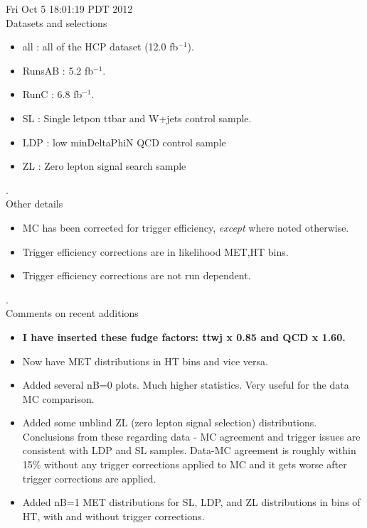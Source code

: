 \documentclass[11pt]{article}
\begin{document}
   Fri Oct  5 18:01:19 PDT 2012 \\

   Datasets and selections
   \begin{itemize}
     \item all : all of the HCP dataset (12.0 fb$^{-1}$).
     \item RunsAB : 5.2 fb$^{-1}$.
     \item RunC : 6.8 fb$^{-1}$.
     \item SL : Single letpon ttbar and W+jets control sample.
     \item LDP : low minDeltaPhiN QCD control sample
     \item ZL : Zero lepton signal search sample
   \end{itemize}

.\\

   Other details
   \begin{itemize}
     \item MC has been corrected for trigger efficiency, {\it except} where noted otherwise.
     \item Trigger efficiency corrections are in likelihood MET,HT bins.
     \item Trigger efficiency corrections are not run dependent.
   \end{itemize}

.\\

  Comments on recent additions
  \begin{itemize}
    \item {\bf I have inserted these fudge factors: ttwj x 0.85 and QCD x 1.60.}
    \item Now have MET distributions in HT bins and vice versa.
    \item Added several nB=0 plots.  Much higher statistics.  Very useful for the data MC comparison.
    \item Added some unblind ZL (zero lepton signal selection) distributions.  Conclusions
          from these regarding data - MC agreement and trigger issues are consistent
          with LDP and SL samples.  Data-MC agreement is roughly within 15\% without
          any trigger corrections applied to MC and it gets worse after
          trigger corrections are applied.
    \item Added nB=1 MET distributions for SL, LDP, and ZL distributions in bins of HT,
          with and without trigger corrections.
   \end{itemize}
\end{document}
